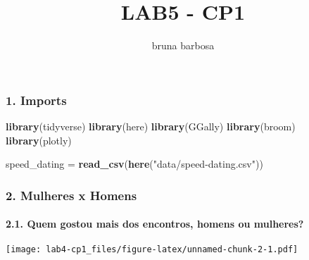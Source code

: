 \documentclass[]{article}
\title{LAB5 - CP1}
\author{bruna barbosa}
\date{}
\newenvironment{Shaded}{\begin{snugshade}}{\end{snugshade}}
\newcommand{\KeywordTok}[1]{\textcolor[rgb]{0.13,0.29,0.53}{\textbf{#1}}}
\newcommand{\DataTypeTok}[1]{\textcolor[rgb]{0.13,0.29,0.53}{#1}}
\newcommand{\StringTok}[1]{\textcolor[rgb]{0.31,0.60,0.02}{#1}}
\newcommand{\OperatorTok}[1]{\textcolor[rgb]{0.81,0.36,0.00}{\textbf{#1}}}
\newcommand{\NormalTok}[1]{#1}
\let\oldparagraph\paragraph
\renewcommand{\paragraph}[1]{\oldparagraph{#1}\mbox{}}
\begin{document}
\maketitle

\subsubsection{1. Imports}\label{imports}

\begin{Shaded}
\begin{Highlighting}[]
\KeywordTok{library}\NormalTok{(tidyverse)}
\KeywordTok{library}\NormalTok{(here)}
\KeywordTok{library}\NormalTok{(GGally)}
\KeywordTok{library}\NormalTok{(broom)}
\KeywordTok{library}\NormalTok{(plotly)}

\NormalTok{speed_dating =}\StringTok{ }\KeywordTok{read_csv}\NormalTok{(}\KeywordTok{here}\NormalTok{(}\StringTok{"data/speed-dating.csv"}\NormalTok{))}
\end{Highlighting}
\end{Shaded}

\subsubsection{2. Mulheres x Homens}\label{mulheres-x-homens}

\paragraph{2.1. Quem gostou mais dos encontros, homens ou
mulheres?}\label{quem-gostou-mais-dos-encontros-homens-ou-mulheres}

\begin{Shaded}
\end{Shaded}

\texttt{[image: lab4-cp1\_files/figure-latex/unnamed-chunk-2-1.pdf]}
\end{document}
